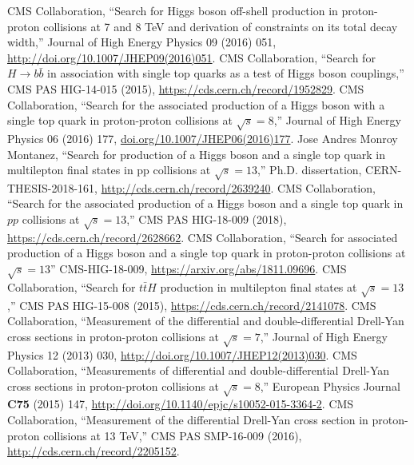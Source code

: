 \begin{thebibliography}{99}
%
    CMS Collaboration, ``Search for Higgs boson off-shell production in proton-proton collisions at 7 and 8 TeV and derivation of constraints on its total decay width,'' Journal of High Energy Physics 09 (2016) 051, \url{http://doi.org/10.1007/JHEP09(2016)051}.
%
%
 CMS Collaboration, ``Search for $H \to b\bar{b}$ in
  association with single top quarks as a test of Higgs boson couplings,'' CMS PAS HIG-14-015 (2015), \url{https://cds.cern.ch/record/1952829}.
%
 CMS Collaboration, ``Search for the associated
  production of a Higgs boson with a single top quark in proton-proton
  collisions at $\sqrt{s} = 8$\TeV,'' Journal of High Energy Physics 06 (2016) 177, \url{doi.org/10.1007/JHEP06(2016)177}.
%
 Jose Andres Monroy Montanez, ``Search for production of a Higgs boson and a single top quark in multilepton final states in pp collisions at $\sqrt{s} = 13$\TeV,'' Ph.D. dissertation, CERN-THESIS-2018-161, \url{http://cds.cern.ch/record/2639240}.
%
 CMS Collaboration, ``Search for the associated
    production of a Higgs boson and a single top quark in $pp$ collisions
    at $\sqrt{s} = 13$\TeV,'' CMS PAS HIG-18-009 (2018),
    \url{https://cds.cern.ch/record/2628662}.
%
 CMS Collaboration, ``Search for associated production of a Higgs boson and a single top quark
 in proton-proton collisions at $\sqrt{s}=13$\TeV'' CMS-HIG-18-009, \url{https://arxiv.org/abs/1811.09696}.
%
 CMS Collaboration, ``Search for $t\bar{t}H$
  production in multilepton final states at $\sqrt{s} = 13$\TeV,'' CMS PAS
  HIG-15-008 (2015), \url{https://cds.cern.ch/record/2141078}.
%
%
    CMS Collaboration, ``Measurement of the differential and double-differential Drell-Yan cross sections in proton-proton collisions at $\sqrt{s}=7$\TeV,''
    Journal of High Energy Physics 12 (2013) 030, \url{http://doi.org/10.1007/JHEP12(2013)030}.
%
    CMS Collaboration, ``Measurements of differential and double-differential Drell-Yan cross sections in proton-proton collisions at $\sqrt{s}=8$\TeV,''
    European Physics Journal {\bf C75} (2015) 147, \url{http://doi.org/10.1140/epjc/s10052-015-3364-2}.
%
    CMS Collaboration, ``Measurement of the differential Drell-Yan cross section in proton-proton collisions at 13 TeV,'' 
    CMS PAS SMP-16-009 (2016), \url{http://cds.cern.ch/record/2205152}.

\end{thebibliography}
